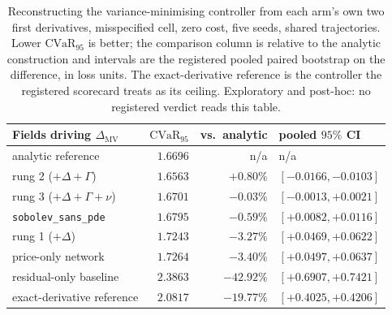 \documentclass{article}
\begin{document}
\begin{table}[!htbp]
\caption{Reconstructing the variance-minimising controller from each arm's own two
first derivatives, misspecified cell, zero cost, five seeds, shared trajectories.
Lower $\mathrm{CVaR}_{95}$ is better; the comparison column is relative to the
analytic construction and intervals are the registered pooled paired bootstrap on
the difference, in loss units. The exact-derivative reference is the controller the
registered scorecard treats as its ceiling. Exploratory and post-hoc: no registered
verdict reads this table.}
\label{tab:mv}
\centering\footnotesize\setlength{\tabcolsep}{5pt}
\begin{tabular}{@{}lrrl@{}}
\toprule
Fields driving $\Delta_{\mathrm{MV}}$ & $\mathrm{CVaR}_{95}$ & vs.\ analytic & pooled $95\%$ CI \\
\midrule
analytic reference & $1.6696$ & n/a & n/a \\
rung 2 ($+\Delta{+}\Gamma$) & $\mathbf{1.6563}$ & $+0.80\%$ & $[-0.0166, -0.0103]$ \\
rung 3 ($+\Delta{+}\Gamma{+}\nu$) & $1.6701$ & $-0.03\%$ & $[-0.0013, +0.0021]$ \\
\texttt{sobolev\_sans\_pde} & $1.6795$ & $-0.59\%$ & $[+0.0082, +0.0116]$ \\
rung 1 ($+\Delta$) & $1.7243$ & $-3.27\%$ & $[+0.0469, +0.0622]$ \\
price-only network & $1.7264$ & $-3.40\%$ & $[+0.0497, +0.0637]$ \\
residual-only baseline & $2.3863$ & $-42.92\%$ & $[+0.6907, +0.7421]$ \\
\midrule
exact-derivative reference & $2.0817$ & $-19.77\%$ & $[+0.4025, +0.4206]$ \\
\bottomrule
\end{tabular}
\end{table}
\end{document}

